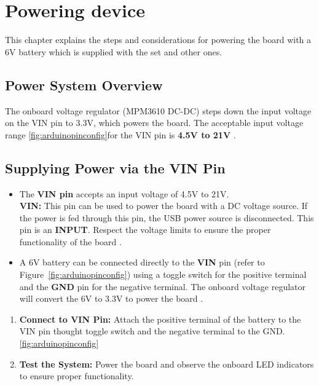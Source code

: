 \section{Powering device}

 This chapter explains the steps and considerations for powering the board with a 6V battery which is supplied with the set and other ones.

\subsection{Power System Overview}
The onboard voltage regulator (MPM3610 DC-DC) steps down the input voltage on the VIN pin to 3.3V, which powers the board. The acceptable input voltage range \ref{fig:arduinopinconfig}for the VIN pin is \textbf{4.5V to 21V} .

\subsection{Supplying Power via the VIN Pin}
\begin{itemize}
    \item The \textbf{VIN pin} accepts an input voltage of 4.5V to 21V. \\
    \textbf{VIN:}  
    This pin can be used to power the board with a DC voltage source. If the power is fed through this pin, the USB power source is disconnected. This pin is an \textbf{INPUT}. Respect the voltage limits to ensure the proper functionality of the board .
    
    \item A 6V battery can be connected directly to the \textbf{VIN} pin (refer to Figure~\ref{fig:arduinopinconfig}) using a toggle switch for the positive terminal and the \textbf{GND} pin for the negative terminal. The onboard voltage regulator will convert the 6V to 3.3V to power the board .
\end{itemize}



\begin{enumerate}

    \item \textbf{Connect to VIN Pin:} Attach the positive terminal of the battery to the VIN pin thought  toggle switch and the negative terminal to the GND.\ref{fig:arduinopinconfig}
  
    \item \textbf{Test the System:} Power the board and observe the onboard LED indicators to ensure proper functionality.
\end{enumerate}






